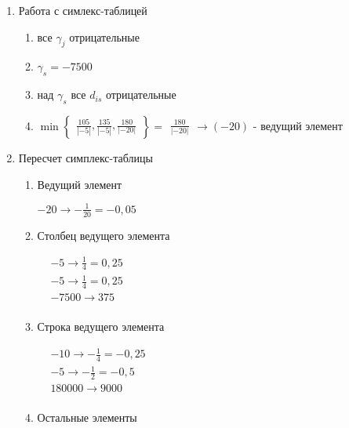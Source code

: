 \documentclass{article}
\renewcommand{\labelenumii}{\arabic{enumii})}
\begin{document}
\begin{enumerate}
\item Работа с симлекс-таблицей

\begin{enumerate}
    \item все $\gamma_j$ отрицательные
    \item $\gamma_s = -7500$
    \item над $\gamma_s$ все $d_{is}$ отрицательные
    \item $\min\left\{\begin{aligned}
        \frac{105}{|-5|}, \frac{135}{|-5|}, \frac{180}{|-20|} 
    \end{aligned}\right\} = \begin{aligned}
        \frac{180}{|-20|}
    \end{aligned} \longrightarrow (-20)$ - ведущий элемент 
\end{enumerate}
\item Пересчет симплекс-таблицы

\renewcommand{\labelenumii}{\Roman{enumii}}

\begin{enumerate}
    \item Ведущий элемент
        
        $-20 \rightarrow -\frac{1}{20} = -0{,}05$
    \item Столбец ведущего элемента 
    
    $\begin{aligned}
        &-5 \rightarrow \frac{1}{4} = 0{,}25\\
        &-5 \rightarrow \frac{1}{4} = 0{,}25\\
        &-7500 \rightarrow 375 \\
    \end{aligned}$

    \item Строка ведущего элемента
    
    $\begin{aligned}
        &-10 \rightarrow -\frac{1}{4} = -0{,}25\\
        &-5 \rightarrow -\frac{1}{2} = -0{,}5\\
        &180000 \rightarrow 9000 \\
    \end{aligned}$

    \pagebreak

    \item Остальные элементы\\
    

\end{enumerate}
\end{enumerate}
\end{document}
